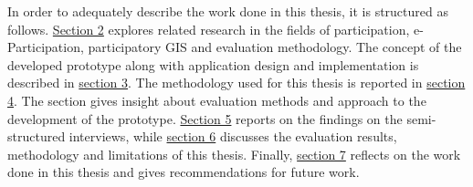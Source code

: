 In order to adequately describe the work done in this thesis, it is structured as follows. \hyperref[chap:related_work]{Section 2} explores related research in the fields of participation, e-Participation, participatory GIS and evaluation methodology. The concept of the developed prototype along with application design and implementation is described in \hyperref[chap:approach]{section 3}. The methodology used for this thesis is reported in \hyperref[chap:methodology]{section 4}. The section gives insight about evaluation methods and approach to the development of the prototype. \hyperref[chap:methodology]{Section 5} reports on the findings on the semi-structured interviews, while \hyperref[chap:discussion]{section 6} discusses the evaluation results, methodology and limitations of this thesis. Finally, \hyperref[chap:conslusion]{section 7} reflects on the work done in this thesis and gives recommendations for future work.




